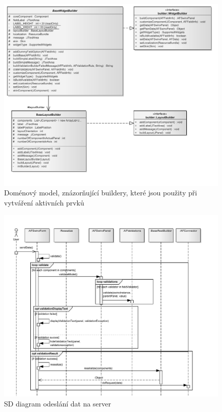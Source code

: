 \documentclass[11pt,twoside,a4paper]{book}
\begin{document}
\begin{figure}
\includegraphics[angle=270]{images/abstractBuilder}
\caption{Doménový model, znázorňující buildery, které jsou použity při vytváření aktivních prvků}
\label{img:abstractBuilder}
\end{figure}	

\begin{figure}
\begin{center}
\includegraphics[angle=270]{images/sdResealization}
\caption{SD diagram odeslání dat na server}
\label{img:sdResealization}
\end{center}
\end{figure}	
\end{document}

